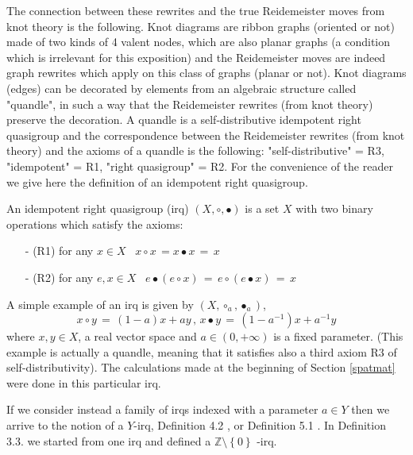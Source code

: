 \documentclass{article}
\begin{document}
The connection between these rewrites and the true Reidemeister moves from knot theory is the following. Knot diagrams are ribbon graphs (oriented or not) made of two kinds of 4 valent nodes, which are also planar graphs (a condition which is irrelevant for this exposition) and the Reidemeister moves are indeed graph rewrites which apply on this class of graphs (planar or not). Knot diagrams (edges) can be decorated by elements from an algebraic structure called "quandle", in such a way that the Reidemeister rewrites (from knot theory) preserve the decoration. A quandle is a self-distributive idempotent right quasigroup and the correspondence between the Reidemeister rewrites (from knot theory) and the axioms of a quandle is the following: "self-distributive" = R3, "idempotent" = R1, "right quasigroup" = R2. For the convenience of the reader we give here the definition of an idempotent right quasigroup. 

\begin{definition}
An idempotent right quasigroup (irq) $\displaystyle (X, \circ, \bullet)$ is a set $X$ with two binary operations which satisfy the axioms: 
\begin{enumerate}
\item[-] (R1) for any $x \in X$ \, $\displaystyle x \circ x \, = x \bullet x \, = \, x$
\item[-] (R2) for any $e, x \in X$ \, $\displaystyle e \bullet ( e \circ x) \, = \, e \circ (e \bullet x) \, = \, x$
\end{enumerate}
\label{irq}
\end{definition}

A simple example of an irq is given by $\displaystyle (X, \circ_{a}, \bullet_{a})$, 
$$\displaystyle x \circ y \, = \, (1-a)x + ay \, , \, x \bullet y \, = \, (1-a^{-1})x + a^{-1}y $$
where $x, y \in X$, a real vector space and $a \in (0, + \infty)$ is a fixed parameter. (This example is actually a quandle, meaning that it satisfies also a third axiom R3 of self-distributivity). The calculations made at the beginning of Section \ref{spatmat} were done in this particular irq. 

If we consider instead a family of irqs indexed with a parameter $a \in Y$ then we arrive to the notion of a $Y$-irq, Definition 4.2 \cite{buligabraided}, or Definition 5.1 \cite{buligaglc}. In Definition 3.3. \cite{buligairq} we started from one irq and defined a $\mathbb{Z} \setminus \left\{ 0 \right\}$ -irq. 
\end{document}

